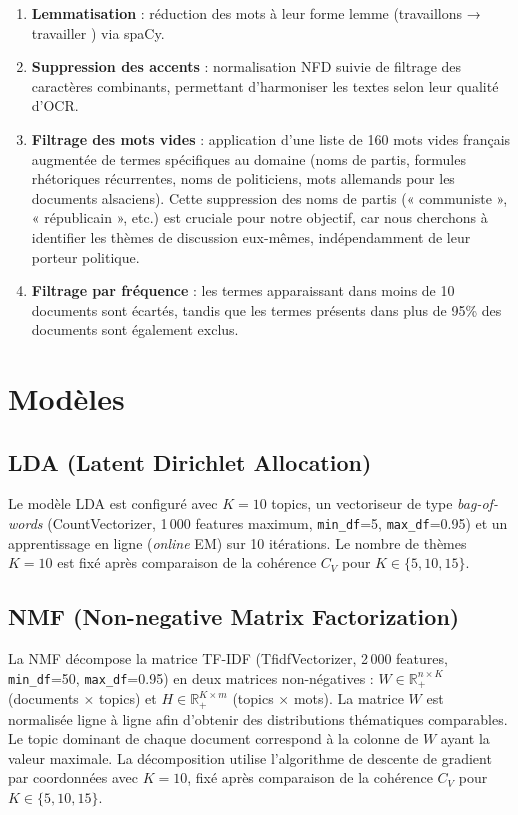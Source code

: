 \documentclass{article}
\begin{document}
\begin{enumerate}
  \item \textbf{Lemmatisation} : réduction des mots à leur forme lemme (travaillons → travailler ) via spaCy.

  \item \textbf{Suppression des accents} : normalisation NFD suivie de filtrage des caractères combinants, permettant d'harmoniser les textes selon leur qualité d'OCR.

  \item \textbf{Filtrage des mots vides} : application d'une liste de 160 mots vides français augmentée de termes spécifiques au domaine (noms de partis, formules rhétoriques récurrentes, noms de politiciens, mots allemands pour les documents alsaciens). Cette suppression des noms de partis (« communiste », « républicain », etc.) est cruciale pour notre objectif, car nous cherchons à identifier les thèmes de discussion eux-mêmes, indépendamment de leur porteur politique.

  \item \textbf{Filtrage par fréquence} : les termes apparaissant dans moins de 10 documents sont écartés, tandis que les termes présents dans plus de 95\% des documents sont également exclus.
\end{enumerate}



\section{Modèles}

\subsection{LDA (Latent Dirichlet Allocation)}
Le modèle LDA est configuré avec $K=10$ topics, un vectoriseur de type \textit{bag-of-words} (CountVectorizer, 1\,000 features maximum, \texttt{min\_df}=5, \texttt{max\_df}=0.95) et un apprentissage en ligne (\textit{online} EM) sur 10 itérations.  Le nombre de thèmes $K=10$ est fixé après comparaison de la cohérence $C_V$ pour $K \in \{5, 10, 15\}$.

\subsection{NMF (Non-negative Matrix Factorization)}
La NMF décompose la matrice TF-IDF (TfidfVectorizer, 2\,000 features, \texttt{min\_df}=50, \texttt{max\_df}=0.95) en deux matrices non-négatives : $W \in \mathbb{R}^{n \times K}_+$ (documents $\times$ topics) et $H \in \mathbb{R}^{K \times m}_+$ (topics $\times$ mots). La matrice $W$ est normalisée ligne à ligne afin d'obtenir des distributions thématiques comparables. Le topic dominant de chaque document correspond à la colonne de $W$ ayant la valeur maximale. La décomposition utilise l'algorithme de descente de gradient par coordonnées avec $K=10$, fixé après comparaison de la cohérence $C_V$ pour $K \in \{5, 10, 15\}$.
\end{document}
